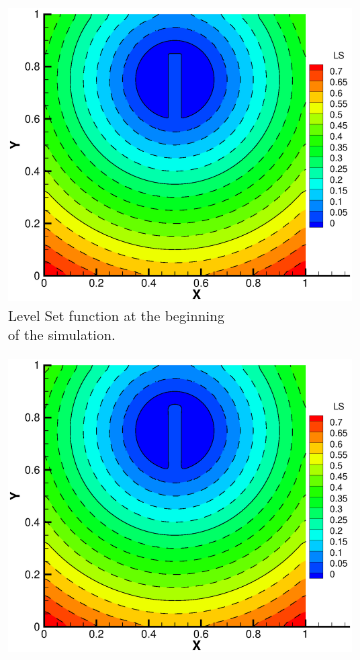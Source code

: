 \documentclass[11pt, a4paper, oneside, openany]{book}
\begin{document}
\begin{figure}[!ht]
	\centering
	\begin{subfigure}{.5\textwidth}
		\captionsetup{justification=centering}
		\includegraphics[trim={1.75cm 1.5cm 2.5cm 2.1cm},clip,width=1\textwidth]{ZalesakWC_T0.eps}
		\caption[Zalesak Initial]{Level Set function at the beginning\\of the simulation.}\label{ZalesakInitial}
	\end{subfigure}%
	\begin{subfigure}{.5\textwidth}
		\captionsetup{justification=centering}
		\includegraphics[trim={1.75cm 1.5cm 2.5cm 2.1cm},clip,width=1\textwidth]{ZalesakWC_T1.eps}

\end{subfigure}
\end{figure}
\end{document}
